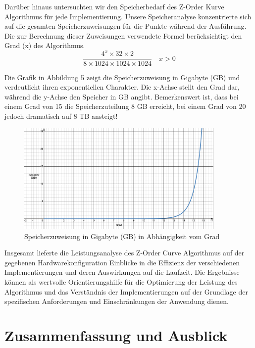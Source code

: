 \documentclass[course=erap]{aspdoc}
\begin{document}
\noindent Darüber hinaus untersuchten wir den Speicherbedarf des Z-Order Kurve Algorithmus für jede Implementierung. Unsere Speicheranalyse konzentrierte sich auf die gesamten Speicherzuweisungen für die Punkte während der Ausführung. Die zur Berechnung dieser Zuweisungen verwendete Formel berücksichtigt den Grad (x) des Algorithmus.
\[
\frac{{4^x \times 32 \times 2}}{{8 \times 1024 \times 1024 \times 1024}}
\quad x > 0
\]
  


\noindent Die Grafik in Abbildung 5 zeigt die Speicherzuweisung in Gigabyte (GB) und verdeutlicht ihren exponentiellen Charakter. Die x-Achse stellt den Grad dar, während die y-Achse den Speicher in GB angibt. Bemerkenswert ist, dass bei einem Grad von 15 die Speicherzuteilung 8 GB erreicht, bei einem Grad von 20 jedoch dramatisch auf 8 TB ansteigt!
\begin{figure}[H]
  \centering
  \includegraphics[width=0.9\textwidth]{resources/speicher_graph.png}
  \caption{Speicherzuweisung in Gigabyte (GB) in Abhängigkeit vom Grad}
  \label{fig:speicher Graph}
\end{figure}

\noindent Insgesamt lieferte die Leistungsanalyse des Z-Order Curve Algorithmus auf der gegebenen Hardwarekonfiguration Einblicke in die Effizienz der verschiedenen Implementierungen und deren Auswirkungen auf die Laufzeit. Die Ergebnisse können als wertvolle Orientierungshilfe für die Optimierung der Leistung des Algorithmus und das Verständnis der Implementierungen auf der Grundlage der spezifischen Anforderungen und Einschränkungen der Anwendung dienen.


\section{Zusammenfassung und Ausblick}
\end{document}
